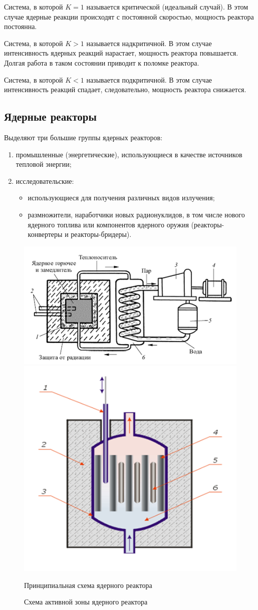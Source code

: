 Система, в которой \( K = 1 \) называется критической (идеальный случай). В этом случае ядерные 
реакции происходят с постоянной скоростью, мощность реактора постоянна.

Система, в которой \( K > 1 \) называется надкритичной. В этом случае
интенсивность ядерных реакций нарастает, мощность реактора повышается. Долгая
работа в таком состоянии приводит к поломке реактора.

Система, в которой \( K < 1 \) называется подкритичной. В этом случае
интенсивность реакций спадает, следовательно, мощность реактора снижается.

\subsection{Ядерные реакторы}
Выделяют три большие группы ядерных реакторов:
\begin{enumerate}
    \item промышленные (энергетические), использующиеся в качестве источников
    тепловой энергии;
    \item исследовательские:
        \begin{itemize}
            \item использующиеся для получения различных видов излучения;
            \item размножители, наработчики новых радионуклидов, в том числе
            нового ядерного топлива или компонентов ядерного оружия
            (реакторы-конвертеры и реакторы-бридеры).
        \end{itemize}
\end{enumerate}

\begin{figure}[!ht]
    \includegraphics[width=.5\textwidth]{scheme} \hspace*{2em}
    \includegraphics[width=.35\textwidth]{active_zone} \\
    \parbox{.5\textwidth}{\caption{Принципиальная схема ядерного реактора}
    \label{picSch}} \hspace*{2em}
    \parbox{.35\textwidth}{\caption{Схема активной зоны ядерного реактора}
    \label{picAZ}}
\end{figure}

